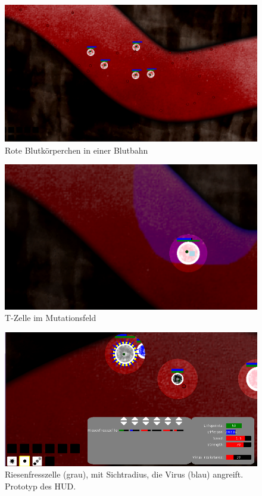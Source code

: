 \begin{figure}[ht]
  \begin{center}
    \includegraphics[width=12cm]{img_screenplay/neutral}
  \end{center}
  \caption{Rote Blutkörperchen in einer Blutbahn}
  \label{fig:heamo_virus}
\end{figure}

\begin{figure}[ht]
  \begin{center}
    \includegraphics[width=12cm]{img_screenplay/tcell}
  \end{center}
  \caption{T-Zelle im Mutationsfeld}
  \label{fig:tcell}
\end{figure}

\begin{figure}[ht]
  \begin{center}
    \includegraphics[width=12cm]{img_screenplay/riesenfresszelle}
  \end{center}
  \caption{Riesenfresszelle (grau), mit Sichtradius, die Virus (blau) angreift.
  Prototyp des HUD.}
  \label{fig:macrophage}
\end{figure}


